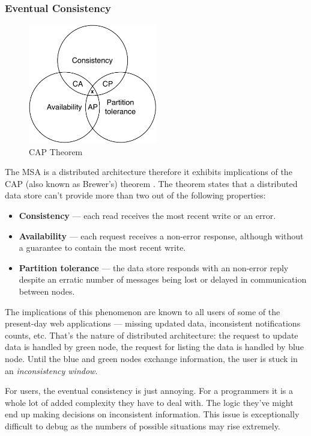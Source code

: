 \documentclass[thesis=M,english,hidelinks]{FITthesis}[2012/10/20]
\begin{document}
\subsubsection{Eventual Consistency}
\begin{figure}
  \centering
    \includegraphics[width=0.5\textwidth]{images/CAP.pdf}
    \caption{CAP Theorem}
    \label{fig:cap}
\end{figure}
The \acrshort{MSA} is a distributed architecture therefore it exhibits implications of the \acrshort{CAP} (also known as Brewer's) theorem \cite{cap-acm}. The theorem states that a distributed data store can't provide more than two out of the following properties:
\begin{itemize}
    \item \textbf{Consistency} --- each read receives the most recent write or an error.
    \item \textbf{Availability} --- each request receives a non-error response, although without a guarantee to contain the most recent write.
    \item \textbf{Partition tolerance} --- the data store responds with an non-error reply despite an erratic number of messages being lost or delayed in communication between nodes.
\end{itemize}

The implications of this phenomenon are known to all users of some of the present-day web applications --- missing updated data, inconsistent notifications counts, etc. That's the nature of distributed architecture: the request to update data is handled by green node, the request for listing the data is handled by blue node. Until the blue and green nodes exchange information, the user is stuck in an \textit{inconsistency window}.

For users, the eventual consistency is just annoying. For a programmers it is a whole lot of added complexity they have to deal with. The logic they've might end up making decisions on inconsistent information. This issue is exceptionally difficult to debug as the numbers of possible situations may rise extremely.
\end{document}
